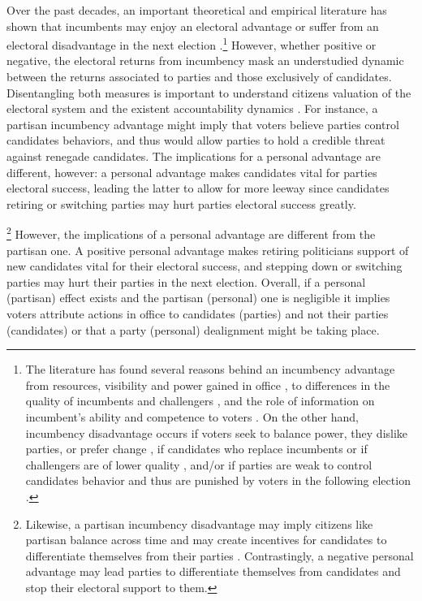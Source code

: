 \documentclass[12pt]{amsart}
\numberwithin{equation}{section}
\theoremstyle{definition}
\theoremstyle{definition}
\theoremstyle{definition}
\begin{document}
Over the past decades, an important theoretical and empirical literature has shown that incumbents may enjoy an electoral advantage \citep{ashworth_2012, cox_morgensten_1993, cox_katz_1996, ansolabehere_snyder_2000, ashworth_bdm_2008, ashworth_etal_2019} or suffer from an electoral disadvantage in the next election \citep{klasnja_2015, klasnja_titiunik_2017}.\footnote{The literature has found several reasons behind an incumbency advantage from resources, visibility and power gained in office \citep{mayhew_1974, fiorina_1989, king_1991, cox_morgensten_1993}, to differences in the quality of incumbents and challengers \citep{cox_katz_1996, levitt_wolfram_1997, ansolabehere_snyder_2000, eggers_2017}, and the role of information on incumbent's ability and competence to voters \citep{ashworth_bdm_2008, ashworth_etal_2019}. On the other hand, incumbency disadvantage occurs if voters seek to balance power, they dislike parties, or prefer change  \citep{fowler_hall_2014, eggers_2017}, if candidates who replace incumbents or if challengers are of lower quality \citep{eggers_2017}, and/or if parties are weak to control candidates behavior and thus are punished by voters in the following election \citep{klasnja_titiunik_2017}.} However, whether positive or negative, the electoral returns from incumbency mask an understudied dynamic between the returns associated to parties and those exclusively of candidates. Disentangling both measures is important to understand citizens valuation of the electoral system and the existent accountability dynamics \citep{mayhew_1974, fowler_hall_2014}. For instance, a partisan incumbency advantage might imply that voters believe parties control candidates behaviors, and thus would allow parties to hold a credible threat against renegade candidates. The implications for a personal advantage are different, however: a personal advantage makes candidates vital for parties electoral success, leading the latter to allow for more leeway since candidates retiring or switching parties may hurt parties electoral success greatly. 

\footnote{Likewise, a partisan incumbency disadvantage may imply citizens like partisan balance across time and may create incentives for candidates to differentiate themselves from their parties \citep{klasnja_titiunik_2017}. Contrastingly, a negative personal advantage may lead parties to differentiate themselves from candidates and stop their electoral support to them.}  However, the implications of a personal advantage are different from the partisan one. A positive personal advantage makes retiring politicians support of new candidates vital for their electoral success, and stepping down or switching parties may hurt their parties in the next election. Overall, if a personal (partisan) effect exists and the partisan (personal) one is negligible it implies voters attribute actions in office to candidates (parties) and not their parties (candidates) or that a party (personal) dealignment might be taking place.   
   
\end{document}
